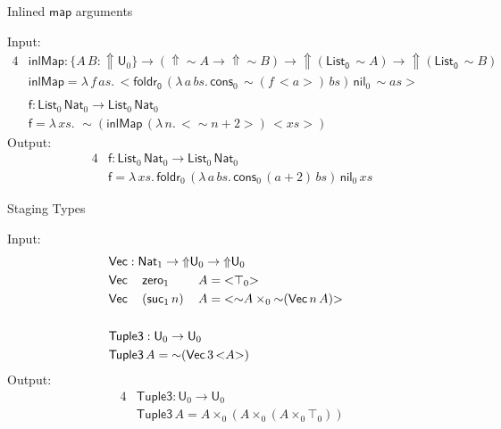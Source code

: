 \documentclass[dvipsnames,aspectratio=169]{beamer}
\renewcommand{\mit}[1]{\mathit{#1}}
\newcommand{\msf}[1]{\mathsf{#1}}
\newcommand{\Lift}{{\Uparrow}}
\newcommand{\spl}{{\sim}}
\newcommand{\qut}[1]{{<}#1{>}}
\newcommand{\U}{\msf{U}}
\newcommand{\List}{\msf{List}}
\newcommand{\nil}{\msf{nil}}
\newcommand{\cons}{\msf{cons}}
\newcommand{\Nat}{\msf{Nat}}
\newcommand{\zero}{\msf{zero}}
\newcommand{\suc}{\msf{suc}}
\theoremstyle{remark}
\newcommand{\Vect}{\msf{Vec}}
\begin{document}
\begin{frame}{Inlined $\msf{map}$ arguments}

Input:
\begin{alignat*}{4}
  & \msf{inlMap} : \{A\,B : \Lift \U_0\} \to (\Lift\spl A \to \Lift\spl B) \to \Lift(\msf{List_0}\,\spl A) \to \Lift(\msf{List_0}\,\spl B) \\
  & \msf{inlMap} = \lambda\,f\,\mit{as}.\,\qut{\msf{foldr_0}\,
    (\lambda\,a\,\mit{bs}.\,\cons_0\,\spl(f\,\qut{a})\,\mit{bs})\,
    \nil_0\,
    \spl{\mit{as}}
    }\\
  & \\
  & \msf{f} : \List_0\,\Nat_0 \to \List_0\,\Nat_0\\
  & \msf{f} = \lambda\,\mit{xs}.\,\,\spl(\msf{inlMap}\,(\lambda\,n.\,\qut{\spl n + 2})
     \,\qut{\mit{xs}})
\end{alignat*}
\pause
Output:
\begin{alignat*}{4}
  & \msf{f} : \List_0\,\Nat_0 \to \List_0\,\Nat_0\\
  & \msf{f} = \lambda\,\mit{xs}.\, \msf{foldr}_0\,(\lambda\,a\,\mit{bs}.\,\cons_0\,(a + 2)\,\mit{bs})\,\nil_0\,\mit{xs}
\end{alignat*}

\end{frame}

\begin{frame}{Staging Types}

Input:
\begin{alignat*}{4}
  & \rlap{$\Vect : \Nat_1 \to \Lift \U_0 \to \Lift \U_0$}\\
  & \Vect\,&&\zero_1    \,&&A = \qut{\top_0}\\
  & \Vect\,&&(\suc_1\,n)\,&&A = \qut{\spl A \times_0 \spl(\Vect\,n\,A)}\\
  & \\
  & \rlap{$\msf{Tuple3} : \U_0 \to \U_0$} \\
  & \rlap{$\msf{Tuple3}\,A = \spl(\Vect\,3\,\qut{A})$}
\end{alignat*}
\pause
Output:
\begin{alignat*}{4}
  &\msf{Tuple3} : \U_0 \to \U_0 \\
  &\msf{Tuple3}\,A = A \times_0 (A \times_0 (A \times_0 \top_0))
\end{alignat*}

\end{frame}
\end{document}
